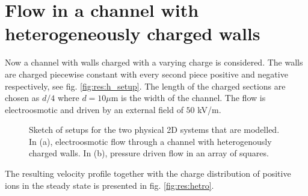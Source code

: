 \section{Flow in a channel with heterogeneously charged walls}

Now a channel with walls charged with a varying charge is
considered. The walls are charged piecewise constant with every second
piece positive and negative respectively, see
fig. \ref{fig:res:h_setup}. The length of the charged sections are
chosen as $d/4$ where $d = 10 \mu$m is the width of the channel. The
flow is electroosmotic and driven by an external field of $50$ kV/m.

\begin{figure}
  \centering
  \hspace{5pt} 
  \caption{Sketch of setups for the two physical 2D systems that are
    modelled. In (a), electroosmotic flow through a channel with
    heterogenously charged walls. In (b), pressure driven flow in an
    array of squares.}
  \label{fig:res:setup}
\end{figure}

The resulting velocity profile together with the charge distribution
of positive ions in the steady state is presented in
fig. \ref{fig:res:hetro}.

